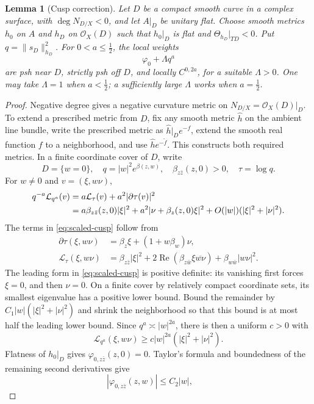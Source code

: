 \documentclass[11pt]{amsart}
\newtheorem{lemma}[theorem]{Lemma}
\theoremstyle{definition}
\theoremstyle{remark}
\numberwithin{equation}{section}
\newcommand{\OO}{\mathcal O}
\newcommand{\Levi}{\mathcal L}
\begin{document}
\begin{lemma}[Cusp correction]\label{lem:cusp}
Let $D$ be a compact smooth curve in a complex surface, with
$\deg N_{D/X}<0$, and let $A|_D$ be unitary flat. Choose smooth
metrics $h_0$ on $A$ and $h_D$ on $\OO_X(D)$ such that $h_0|_D$ is
flat and $\Theta_{h_D}|_{TD}<0$. Put $q=\|s_D\|_{h_D}^2$.
For $0<a\le\tfrac12$, the local weights
\[
 \varphi_0+\Lambda q^a
\]
are psh near $D$, strictly psh off $D$, and locally $C^{0,2a}$,
for a suitable $\Lambda>0$. One may take $\Lambda=1$ when
$a<\tfrac12$; a sufficiently large $\Lambda$ works when
$a=\tfrac12$.
\end{lemma}
\begin{proof}
Negative degree gives a negative curvature metric on
$N_{D/X}=\OO_X(D)|_D$. To extend a prescribed metric from $D$,
fix any smooth metric $\widehat h$ on the ambient line bundle,
write the prescribed metric as $\widehat h|_D e^{-f}$, extend the
smooth real function $f$ to a neighborhood, and use
$\widehat h e^{-\widetilde f}$. This constructs both required metrics.
In a finite coordinate cover of $D$, write
\[
 D=\{w=0\},\quad q=|w|^2e^{\beta(z,w)},\quad
 \beta_{z\bar z}(z,0)>0,\quad \tau=\log q.
\]
For $w\ne0$ and $v=(\xi,w\nu)$,
\begin{align}\label{eq:scaled-cusp}
 q^{-a}\Levi_{q^a}(v)
 &=a\Levi_\tau(v)+a^2|\partial\tau(v)|^2\notag\\
 &=a\beta_{z\bar z}(z,0)|\xi|^2
   +a^2|\nu+\beta_z(z,0)\xi|^2
   +O(|w|)(|\xi|^2+|\nu|^2).
\end{align}
The terms in \eqref{eq:scaled-cusp} follow from
\[
 \begin{split}
 \partial\tau(\xi,w\nu)
 &=\beta_z\xi+(1+w\beta_w)\nu,\\
 \Levi_\tau(\xi,w\nu)
 &=\beta_{z\bar z}|\xi|^2
   +2\operatorname{Re}(\beta_{z\bar w}\xi\overline{w\nu})
   +\beta_{w\bar w}|w\nu|^2.
 \end{split}
\]
The leading form in \eqref{eq:scaled-cusp} is positive definite:
its vanishing first forces $\xi=0$, and then $\nu=0$.
On a finite cover by relatively compact coordinate sets, its smallest
eigenvalue has a positive lower bound. Bound the remainder by
$C_1|w|(|\xi|^2+|\nu|^2)$ and shrink the neighborhood so that
this bound is at most half the leading lower bound.
Since $q^a\asymp|w|^{2a}$, there is then a uniform $c>0$ with
\[
 \Levi_{q^a}(\xi,w\nu)\ge c|w|^{2a}(|\xi|^2+|\nu|^2).
\]
Flatness of $h_0|_D$ gives $\varphi_{0,z\bar z}(z,0)=0$.
Taylor's formula and boundedness of the remaining second derivatives
give
\[
 |\varphi_{0,z\bar z}(z,w)|\le C_2|w|,\qquad
\]
\end{proof}
\end{document}
